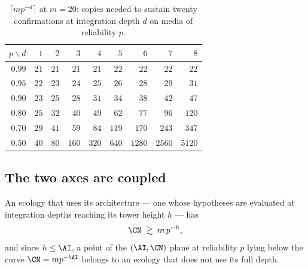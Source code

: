 \begin{table}[h]
\centering
\begin{tabular}{rrrrrrrrr}
\toprule
$p \backslash d$ & $1$ & $2$ & $3$ & $4$ & $5$ & $6$ & $7$ & $8$ \\
\midrule
$0.99$ & $21$ & $21$ & $21$ & $21$ & $22$ & $22$ & $22$ & $22$ \\
$0.95$ & $22$ & $23$ & $24$ & $25$ & $26$ & $28$ & $29$ & $31$ \\
$0.90$ & $23$ & $25$ & $28$ & $31$ & $34$ & $38$ & $42$ & $47$ \\
$0.80$ & $25$ & $32$ & $40$ & $49$ & $62$ & $77$ & $96$ & $120$ \\
$0.70$ & $29$ & $41$ & $59$ & $84$ & $119$ & $170$ & $243$ & $347$ \\
$0.50$ & $40$ & $80$ & $160$ & $320$ & $640$ & $1280$ & $2560$ & $5120$ \\
\bottomrule
\end{tabular}
\caption{$\lceil m p^{-d}\rceil$ at $m = 20$: copies needed to sustain
twenty confirmations at integration depth $d$ on media of reliability $p$.}
\label{scm:tab:sampling}
\end{table}

\subsection{The two axes are coupled}

\begin{proposition}
\label{scm:prop:frontier}
An ecology that uses its architecture --- one whose hypotheses are
evaluated at integration depths reaching its tower height $h$ --- has
\[
  \CN \;\gtrsim\; m\, p^{-h},
\]
and since $h \le \AI$, a point of the $(\AI, \CN)$ plane at reliability
$p$ lying below the curve $\CN = m p^{-\AI}$ belongs to an ecology that
does not use its full depth.
\end{proposition}

